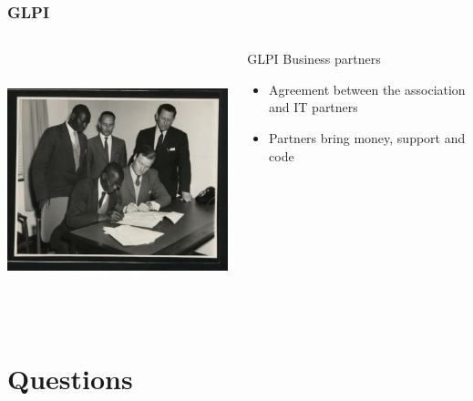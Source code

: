 \documentclass{beamer}
\begin{document}
\begin{frame}

    \frametitle{GLPI}

 \begin{columns}
 \begin{column}{0.35\textwidth}
         \includegraphics[height=7.5cm]{./pics/agreement.jpg}
 \end{column}
 \begin{column}{0.65\textwidth}

    \begin{block}{GLPI Business partners}
        \begin{itemize}
            \item Agreement between the association and IT partners
            \item Partners bring money, support and code
        \end{itemize}
    \end{block}


 \end{column}
\end{columns}

\end{frame}

\section{Questions}
\end{document}
